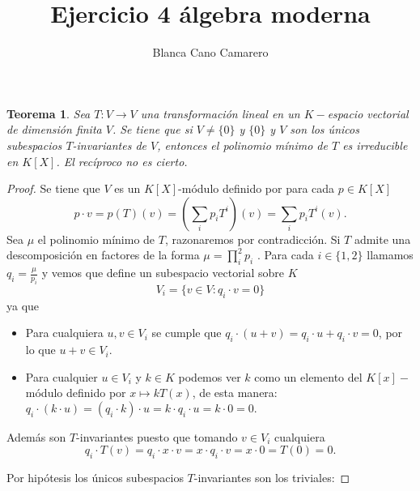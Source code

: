 \documentclass{article}
\title{Ejercicio 4 álgebra moderna}
\author{Blanca Cano Camarero}
\newtheorem*{teorema*}{Teorema}
\begin{document}
\maketitle

\begin{teorema*}
    Sea $T:V \longrightarrow V$ una transformación lineal en un $K-$espacio vectorial de dimensión finita $V$.
    Se tiene que si $V \neq \{0\}$ y $\{0\}$ y $V$ son los únicos 
    subespacios $T$-invariantes de $V$, entonces el polinomio mínimo de $T$ es irreducible en $K[X]$. El recíproco no es cierto. 
\end{teorema*}   

\begin{proof}

    Se tiene que $V$ es un $K[X]$-módulo definido por para cada
    $p \in K[X]$
    \begin{equation*}
        p \cdot v 
        = 
        p (T) (v) 
        = 
        \left(
            \sum_i p_i T^i
        \right)
        (v)
        = 
        \sum_i p_i T^i(v).
    \end{equation*}
   Sea $\mu$ el polinomio mínimo de $T$, razonaremos por contradicción. 
   Si $T$ admite una descomposición en factores de la forma
   $\mu = \prod^2_i p_i$ . 
   Para cada $i \in \{1, 2\}$ llamamos  $q_i = \frac{\mu}{p_i}$ y vemos que define un subespacio vectorial sobre $K$
   \begin{equation*}
       V_i = \{ v \in V : q_i \cdot v = 0\}
   \end{equation*}
   ya que
   \begin{itemize}
       \item Para cualquiera $u,v \in V_i$ se cumple que 
       $q_i \cdot (u + v) = q_i \cdot u +q_i \cdot v = 0$,
        por lo que $u+v  \in V_i$. 
        \item Para cualquier $u \in V_i$ y $k \in K$ podemos ver $k$ como un elemento del  $K[x]-$módulo definido por 
        $x \mapsto kT(x)$, de esta manera: 
        $q_i \cdot (k \cdot u) = (q_i \cdot k )\cdot u = k \cdot q_i \cdot u =  k \cdot 0 = 0.$
   \end{itemize}
    Además son $T$-invariantes puesto que tomando  
    $v \in V_i$ cualquiera 
   \begin{equation*}
       q_i \cdot T(v) 
       = q_i \cdot x \cdot  v 
       = x \cdot q_i \cdot v 
       = x \cdot 0
       = T(0)
       = 0. 
   \end{equation*}

Por hipótesis los únicos subespacios $T$-invariantes son los triviales:


\end{proof}
\end{document}
